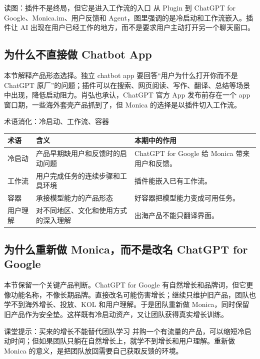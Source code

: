 \documentclass[a4paper]{article}
\begin{document}
\begin{knowledgebox}{读图：插件不是终局，但它是进入工作流的入口}
从 Plugin 到 ChatGPT for Google、Monica.im、用户反馈和 Agent，图里强调的是冷启动和工作流嵌入。插件让 AI 出现在用户已经工作的地方，而不是要求用户主动打开另一个聊天窗口。
\end{knowledgebox}

\subsection{为什么不直接做 Chatbot App}

本节解释产品形态选择。独立 chatbot app 要回答“用户为什么打开你而不是 ChatGPT 原厂”的问题；插件可以在搜索、网页阅读、写作、翻译、总结等场景中出现，降低启动阻力。肖弘也承认，ChatGPT 官方 App 发布前存在一个 app 窗口期，一些海外套壳产品抓到了，但 Monica 的选择是以插件切入工作流。

\begin{knowledgebox}{术语消化：冷启动、工作流、容器}
\noindent\begin{tabularx}{\textwidth}{p{}p{}X}
\toprule
术语 & 含义 & 本期中的作用 \\
\midrule
冷启动 & 产品早期缺用户和反馈时的启动问题 & ChatGPT for Google 给 Monica 带来用户和反馈。 \\
工作流 & 用户完成任务的连续步骤和工具环境 & 插件能嵌入已有工作流。 \\
容器 & 承接模型能力的产品形态 & 好容器把模型能力变成可用任务。 \\
用户理解 & 对不同地区、文化和使用方式的深入理解 & 出海产品不能只翻译界面。 \\
\bottomrule
\end{tabularx}
\end{knowledgebox}

\subsection{为什么重新做 Monica，而不是改名 ChatGPT for Google}

本节保留一个关键产品判断。ChatGPT for Google 有自然增长和品牌词，但它更像功能名称，不像长期品牌。直接改名可能伤害增长；继续只维护旧产品，团队也学不到海外增长、投放、KOL 和用户理解。于是团队重新做 Monica，同时保留旧产品作为安全垫。这样既有冷启动资产，又让团队获得真实增长训练。

\begin{importantbox}{课堂提示：买来的增长不能替代团队学习}
并购一个有流量的产品，可以缩短冷启动时间；但如果团队只躺在自然增长上，就学不到增长和用户理解。重新做 Monica 的意义，是把团队放回需要自己获取反馈的环境。
\end{importantbox}
\end{document}
